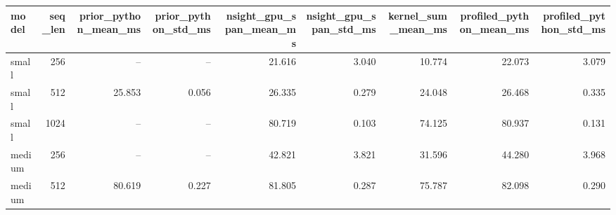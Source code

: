 \begin{tabular}{lrrrrrrrr}
\toprule
model & seq\_len & prior\_python\_mean\_ms & prior\_python\_std\_ms & nsight\_gpu\_span\_mean\_ms & nsight\_gpu\_span\_std\_ms & kernel\_sum\_mean\_ms & profiled\_python\_mean\_ms & profiled\_python\_std\_ms \\
\midrule
small & 256 & -- & -- & 21.616 & 3.040 & 10.774 & 22.073 & 3.079 \\
small & 512 & 25.853 & 0.056 & 26.335 & 0.279 & 24.048 & 26.468 & 0.335 \\
small & 1024 & -- & -- & 80.719 & 0.103 & 74.125 & 80.937 & 0.131 \\
medium & 256 & -- & -- & 42.821 & 3.821 & 31.596 & 44.280 & 3.968 \\
medium & 512 & 80.619 & 0.227 & 81.805 & 0.287 & 75.787 & 82.098 & 0.290 \\
\bottomrule
\end{tabular}
